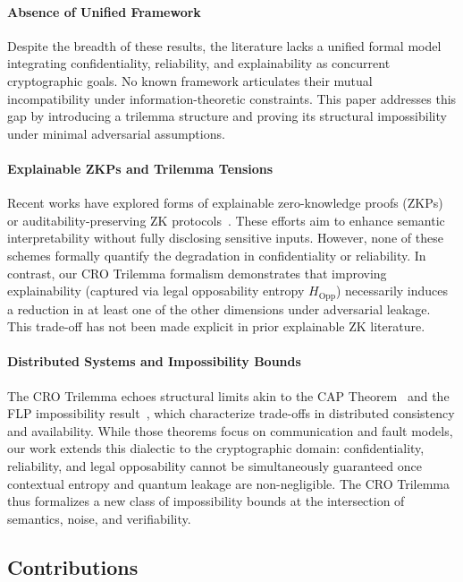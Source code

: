 \documentclass[preprint,12pt]{elsarticle}
\begin{document}
            \paragraph{Absence of Unified Framework}  
            Despite the breadth of these results, the literature lacks a unified formal model integrating confidentiality, reliability, and explainability as concurrent cryptographic goals. No known framework articulates their mutual incompatibility under information-theoretic constraints. This paper addresses this gap by introducing a trilemma structure and proving its structural impossibility under minimal adversarial assumptions.

            \paragraph{Explainable ZKPs and Trilemma Tensions}
            Recent works have explored forms of explainable zero-knowledge proofs (ZKPs) or auditability-preserving ZK protocols~\cite{rosen2021auditable, fuchsbauer2020zkinterface}. These efforts aim to enhance semantic interpretability without fully disclosing sensitive inputs. However, none of these schemes formally quantify the degradation in confidentiality or reliability. In contrast, our CRO Trilemma formalism demonstrates that improving explainability (captured via legal opposability entropy $H_{\text{Opp}}$) necessarily induces a reduction in at least one of the other dimensions under adversarial leakage. This trade-off has not been made explicit in prior explainable ZK literature.

            \paragraph{Distributed Systems and Impossibility Bounds}
            The CRO Trilemma echoes structural limits akin to the CAP Theorem~\cite{gilbert2002brewer} and the FLP impossibility result~\cite{fischer1985impossibility}, which characterize trade-offs in distributed consistency and availability. While those theorems focus on communication and fault models, our work extends this dialectic to the cryptographic domain: confidentiality, reliability, and legal opposability cannot be simultaneously guaranteed once contextual entropy and quantum leakage are non-negligible. The CRO Trilemma thus formalizes a new class of impossibility bounds at the intersection of semantics, noise, and verifiability.


        \subsection{Contributions}
\end{document}
